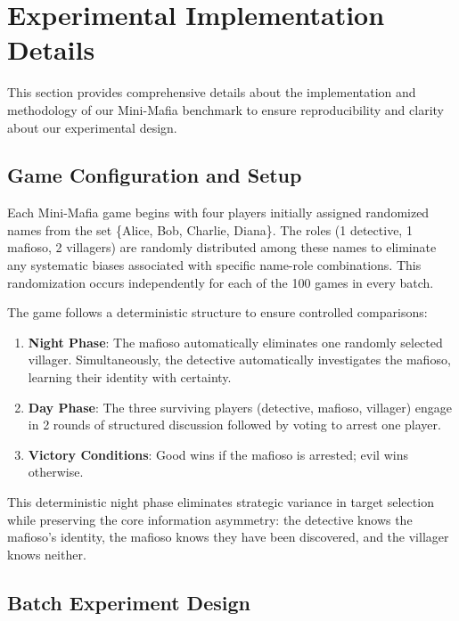 \documentclass{article}
\begin{document}






\appendix

\section{Experimental Implementation Details}
\label{appendix:experimental_details}

This section provides comprehensive details about the implementation and methodology of our Mini-Mafia benchmark to ensure reproducibility and clarity about our experimental design.

\subsection{Game Configuration and Setup}

Each Mini-Mafia game begins with four players initially assigned randomized names from the set \{Alice, Bob, Charlie, Diana\}. The roles (1 detective, 1 mafioso, 2 villagers) are randomly distributed among these names to eliminate any systematic biases associated with specific name-role combinations. This randomization occurs independently for each of the 100 games in every batch.

The game follows a deterministic structure to ensure controlled comparisons:
\begin{enumerate}
    \item \textbf{Night Phase}: The mafioso automatically eliminates one randomly selected villager. Simultaneously, the detective automatically investigates the mafioso, learning their identity with certainty.
    \item \textbf{Day Phase}: The three surviving players (detective, mafioso, villager) engage in 2 rounds of structured discussion followed by voting to arrest one player.
    \item \textbf{Victory Conditions}: Good wins if the mafioso is arrested; evil wins otherwise.
\end{enumerate}

This deterministic night phase eliminates strategic variance in target selection while preserving the core information asymmetry: the detective knows the mafioso's identity, the mafioso knows they have been discovered, and the villager knows neither.

\subsection{Batch Experiment Design}
\end{document}
